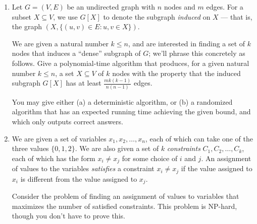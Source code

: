 \documentclass[12pt]{article}
\begin{document}
\begin{enumerate}


\item 

Let $G = (V,E)$ be an undirected graph with $n$ nodes
and $m$ edges.
For a subset $X \subseteq V$, we use
$G[X]$ to denote the subgraph {\em induced} on $X$ ---
that is, the graph $(X,\{(u,v) \in E: u, v \in X\})$.

We are given a natural number $k \leq n$, and
are interested in finding a set of $k$ nodes
that induces a ``dense'' subgraph of $G$;
we'll phrase this concretely as follows.
Give a polynomial-time algorithm that produces,
for a given natural number $k \leq n$,
a set $X \subseteq V$ of $k$ nodes with the property
that the induced subgraph $G[X]$
has at least
$\frac{m k (k-1)}{n (n-1)}$
edges.

You may give either (a) a deterministic algorithm,
or (b) a randomized algorithm that has an expected running time
achieving the given bound, and which only outputs correct answers.




\item 

We are given a set of variables $x_1, x_2, \ldots, x_n$,
each of which can take one of the three values $\{0, 1, 2\}$.
We are also given a set of $k$ {\em constraints} $C_1, C_2, \ldots, C_k$,
each of which has the form $x_i \neq x_j$
for some choice of $i$ and $j$.
An assignment of values to the variables
{\em satisfies} a constraint $x_i \neq x_j$ if
the value assigned to $x_i$ is different from the
value assigned to $x_j$.

Consider the problem of finding an assignment of values
to variables that maximizes the number of satisfied constraints.
This problem is NP-hard, though you don't have to prove this.


\end{enumerate}
\end{document}
